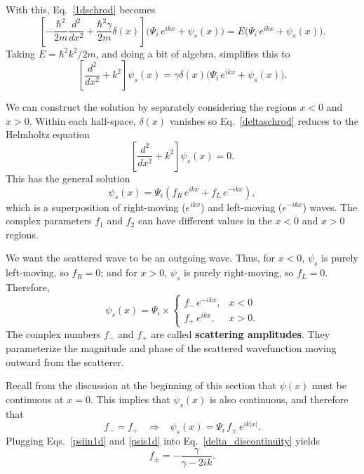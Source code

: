 \documentclass[pra,12pt]{revtex4-2}
\begin{document}
With this, Eq.~\eqref{1dschrod} becomes
\begin{equation}
  \left[-\frac{\hbar^2}{2m} \frac{d^2}{dx^2} + \frac{\hbar^2\gamma}{2m}\delta(x)\right] \Big(\Psi_i \, e^{ikx} + \psi_s(x) \Big)
  = E \Big(\Psi_i \, e^{ikx} + \psi_s(x) \Big).
\end{equation}
Taking $E = \hbar^2k^2/2m$, and doing a bit of algebra, simplifies this to
\begin{equation}
  \left[ \frac{d^2}{dx^2} + k^2\right] \psi_s(x)
  = \gamma \delta(x) \Big(\Psi_i \, e^{ikx} + \psi_s(x) \Big).
  \label{deltaschrod}
\end{equation}

We can construct the solution by separately considering the regions $x
< 0$ and $x > 0$.  Within each half-space, $\delta(x)$ vanishes so
Eq.~\eqref{deltaschrod} reduces to the Helmholtz equation
\begin{equation}
  \left[\frac{d^2}{dx^2} + k^2\right] \psi_s(x) = 0.
\end{equation}
This has the general solution
\begin{equation}
  \psi_s(x) = \Psi_i \left(f_R \, e^{ik x} + f_L \, e^{-ik x}\right),
\end{equation}
which is a superposition of right-moving ($e^{ikx}$) and left-moving
($e^{-ikx}$) waves.  The complex parameters $f_1$ and $f_2$ can
have different values in the $x < 0$ and $x > 0$ regions.

We want the scattered wave to be an outgoing wave.  Thus, for $x < 0$,
$\psi_s$ is purely left-moving, so $f_R = 0$; and for $x > 0$,
$\psi_s$ is purely right-moving, so $f_L = 0$.  Therefore,
\begin{equation}
  \psi_s(x) = \Psi_i \times \begin{cases}f_- \,e^{-ikx}, & x < 0 \\ f_+ \,e^{ikx}, & x > 0.\end{cases}
\end{equation}
The complex numbers $f_-$ and $f_+$ are called \textbf{scattering
  amplitudes}.  They parameterize the magnitude and phase of the
scattered wavefunction moving outward from the scatterer.

Recall from the discussion at the beginning of this section that
$\psi(x)$ must be continuous at $x = 0$.  This implies that
$\psi_s(x)$ is also continuous, and therefore that
\begin{equation}
  f_- = f_+ \;\;\;\Rightarrow \;\;\;
  \psi_s(x) = \Psi_i \,f_\pm\, e^{ik|x|}.
  \label{psis1d}
\end{equation}
Plugging Eqs.~\eqref{psiin1d} and \eqref{psis1d} into
Eq.~\eqref{delta_discontinuity} yields
\begin{equation}
  f_\pm = -\frac{\gamma}{\gamma - 2ik}.
\end{equation}
\end{document}
